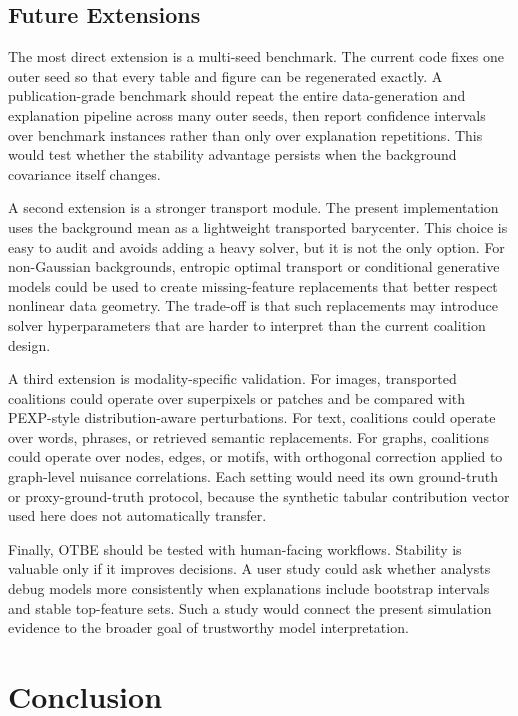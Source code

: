 \documentclass[10pt,conference,letterpaper]{IEEEtran}
\newcommand{\method}{OTBE}
\begin{document}
\subsection{Future Extensions}
The most direct extension is a multi-seed benchmark.  The current code fixes one outer seed so that every table and figure can be regenerated exactly.  A publication-grade benchmark should repeat the entire data-generation and explanation pipeline across many outer seeds, then report confidence intervals over benchmark instances rather than only over explanation repetitions.  This would test whether the stability advantage persists when the background covariance itself changes.

A second extension is a stronger transport module.  The present implementation uses the background mean as a lightweight transported barycenter.  This choice is easy to audit and avoids adding a heavy solver, but it is not the only option.  For non-Gaussian backgrounds, entropic optimal transport or conditional generative models could be used to create missing-feature replacements that better respect nonlinear data geometry.  The trade-off is that such replacements may introduce solver hyperparameters that are harder to interpret than the current coalition design.

A third extension is modality-specific validation.  For images, transported coalitions could operate over superpixels or patches and be compared with PEXP-style distribution-aware perturbations.  For text, coalitions could operate over words, phrases, or retrieved semantic replacements.  For graphs, coalitions could operate over nodes, edges, or motifs, with orthogonal correction applied to graph-level nuisance correlations.  Each setting would need its own ground-truth or proxy-ground-truth protocol, because the synthetic tabular contribution vector used here does not automatically transfer.

Finally, \method{} should be tested with human-facing workflows.  Stability is valuable only if it improves decisions.  A user study could ask whether analysts debug models more consistently when explanations include bootstrap intervals and stable top-feature sets.  Such a study would connect the present simulation evidence to the broader goal of trustworthy model interpretation.

\section{Conclusion}
\end{document}
